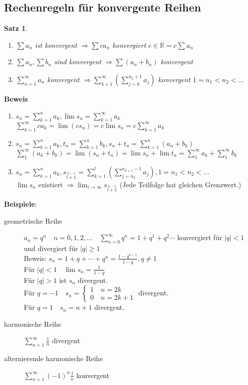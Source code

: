 \documentclass[ngerman,titlepage,twoside, parskip=half*]{scrreprt}
\newcommand*{\R}{\mathbb{R}}
\theoremstyle{plain}
\newtheorem{theorem}{Satz}[section]
\theoremstyle{definition}
\theoremstyle{remark}
\newcommand*{\abs}[2][]{#1\lvert#2#1\rvert}
\begin{document}
\subsection{Rechenregeln für konvergente Reihen}
\begin{theorem}
\label{satz:RechenregelReihe}
\begin{enumerate}[(1)]
  \item $\sum a_n$ ist konvergent $\Rightarrow \sum ca_n$ konvergiert $c\in \R =c\sum a_n$
  \item $\sum a_n, \sum b_n$ sind konvergent $\Rightarrow \sum(a_n+b_n)$ konvergent
  \item $\sum_{n=1}^\infty a_n$ konvergent $\Rightarrow \sum_{k+1}^\infty (\sum_{j=k}^{n_k+1} a_j)$ konvergent $1=n_1<n_2<\ldots$
\end{enumerate}
\end{theorem}
\textbf{Beweis}
\begin{enumerate}[(1)]
  \item $s_n=\sum_{k=1}^n a_k, \lim s_n=\sum_{k=1}^\infty a_k$\\
    $\sum_{k=1}^\infty ca_k =\lim(cs_n)=c\lim s_n =c\sum_{k=1}^\infty a_k$
  \item $s_n=\sum_{k=1}^n a_k, t_n=\sum_{k=1}^n b_k, s_n+t_n=\sum_{k=1}^n (a_n+ b_k)$\\
    $\sum_1^\infty (a_k+b_k)=\lim (s_n+t_n)=\lim s_n +\lim t_n=\sum_1^\infty a_k +\sum_1^\infty b_k$
  \item $s_n=\sum_{k=1}^n a_k, s_{\stackrel{n-1}{l+1}}=\sum_{k=1}^l(\sum_{j=n_k}^{n_{k+1}-1} a_j), 1=n_1<n_2<\ldots$\\
    $\lim s_n$ existiert $\Rightarrow \lim_{l\rightarrow \infty}
    s_{\stackrel{n-1}{l+1}}$ (Jede Teilfolge hat gleichen Grenzwert.)
\end{enumerate}
\textbf{Beispiele}:
\begin{description}
  \item[geometrische Reihe] $a_n=q^n \quad n=0,1,2,\ldots \quad \sum_{n=0}^\infty q^n=1+q^1+q^2\cdots$
    kon\-ver\-giert für $\abs{q}<1$ und divergiert für $\abs{q}\geq 1$\\
    Beweis: $s_n =1+q+\cdots +q^n=\frac{1-q^{n-1}}{1-q}, q\neq 1$\\
    Für $\abs{q}<1 \quad \lim s_n=\frac{1}{1-q}$\\
    Für $\abs{q}>1$ ist $s_n$ divergent.\\
    Für $q=-1 \quad s_n=\begin{cases}1 \quad n=2k\\0 \quad n=2k+1\end{cases}$ divergent.\\
    Für $q=1 \quad s_n=n+1$ divergent.
  \item[harmonische Reihe] $\sum_{n=1}^\infty \frac{1}{n}$ divergent
  \item[alternierende harmonische Reihe]  $\sum_{n=1}^\infty (-1)^n\frac{1}{n}$ konvergent
\end{description}
\end{document}
